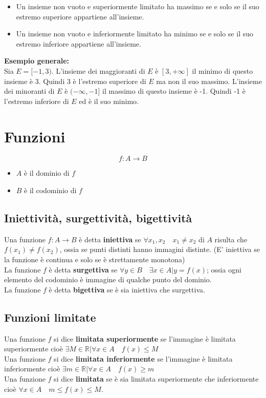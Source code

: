 \documentclass[12pt, a4paper]{report}
\begin{document}
    \begin{itemize}
        \item Un insieme non vuoto e superiormente limitato ha massimo se e solo se il suo estremo superiore appartiene all'insieme.
        \item Un insieme non vuoto e inferiormente limitato ha minimo se e solo se il suo estremo inferiore appartiene all'insieme.
    \end{itemize}
    \textbf{Esempio generale:}\\
    Sia $E=[-1,3)$. L'insieme dei maggioranti di $E$ è $[3,+\infty]$ il minimo di questo insieme è 3. Quindi 3 è l'estremo superiore di $E$ ma non il suo massimo. L'insieme dei minoranti di $E$ è $(-\infty,-1]$ il massimo di questo insieme è -1. Quindi -1 è l'estremo inferiore di $E$ ed è il suo minimo.
    \chapter{Funzioni}
    \begin{equation*}
        f: A \rightarrow B
    \end{equation*}
    \begin{itemize}
        \item $A$ è il dominio di $f$
        \item $B$ è il codominio di $f$
    \end{itemize}
    \section{Iniettività, surgettività, bigettività}
    Una funzione $f: A \rightarrow B$ è detta \textbf{iniettiva} se $\forall x_{1},x_{2} \quad x_{1}\neq x_{2}$ di $A$ risulta che $f(x_{1})\neq f(x_{2})$, ossia se punti distinti hanno immagini distinte. (E' iniettiva se la funzione è continua e solo se è strettamente monotona)\\
    La funzione $f$ è detta \textbf{surgettiva} se $\forall y \in B \quad \exists x \in A | y=f(x)$; ossia ogni elemento del codominio è immagine di qualche punto del dominio.\\
    La funzione $f$ è detta \textbf{bigettiva} se è sia iniettiva che surgettiva.
    \section{Funzioni limitate}
    Una funzione $f$ si dice \textbf{limitata superiormente} se l'immagine è limitata superiormente cioè $\exists M \in \mathbb{R} | \forall x \in A \quad f(x)\leq M$\\
    Una funzione $f$ si dice \textbf{limitata inferiormente} se l'immagine è limitata inferiormente cioè $\exists m \in \mathbb{R} | \forall x \in A \quad f(x)\geq m$\\
    Una funzione $f$ si dice \textbf{limitata} se è sia limitata superiormente che inferiormente cioè $\forall x \in A \quad m\leq f(x)\leq M$.
\end{document}
